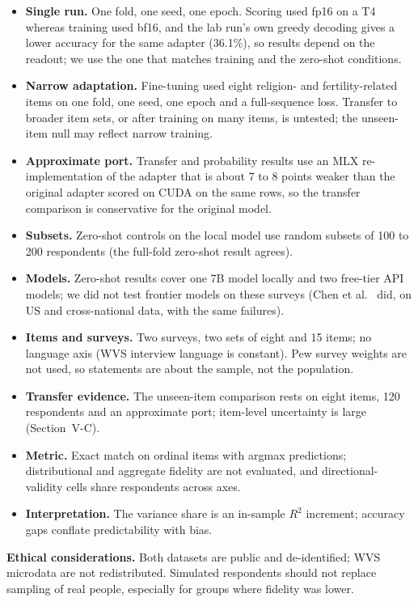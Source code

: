 \documentclass[conference]{IEEEtran}
\begin{document}
\begin{itemize}
    \item \textbf{Single run.} One fold, one seed, one epoch. Scoring used fp16 on a T4 whereas training used bf16, and the lab run's own greedy decoding gives a lower accuracy for the same adapter (36.1\%), so results depend on the readout; we use the one that matches training and the zero-shot conditions.
    \item \textbf{Narrow adaptation.} Fine-tuning used eight religion- and fertility-related items on one fold, one seed, one epoch and a full-sequence loss. Transfer to broader item sets, or after training on many items, is untested; the unseen-item null may reflect narrow training.
    \item \textbf{Approximate port.} Transfer and probability results use an MLX re-implementation of the adapter that is about 7 to 8 points weaker than the original adapter scored on CUDA on the same rows, so the transfer comparison is conservative for the original model.
    \item \textbf{Subsets.} Zero-shot controls on the local model use random subsets of 100 to 200 respondents (the full-fold zero-shot result agrees).
    \item \textbf{Models.} Zero-shot results cover one 7B model locally and two free-tier API models; we did not test frontier models on these surveys (Chen et al.~\cite{chen2026} did, on US and cross-national data, with the same failures).
    \item \textbf{Items and surveys.} Two surveys, two sets of eight and 15 items; no language axis (WVS interview language is constant). Pew survey weights are not used, so statements are about the sample, not the population.
    \item \textbf{Transfer evidence.} The unseen-item comparison rests on eight items, 120 respondents and an approximate port; item-level uncertainty is large (Section~V-C).
    \item \textbf{Metric.} Exact match on ordinal items with argmax predictions; distributional and aggregate fidelity are not evaluated, and directional-validity cells share respondents across axes.
    \item \textbf{Interpretation.} The variance share is an in-sample $R^2$ increment; accuracy gaps conflate predictability with bias.
\end{itemize}

\textbf{Ethical considerations.} Both datasets are public and de-identified; WVS microdata are not redistributed. Simulated respondents should not replace sampling of real people, especially for groups where fidelity was lower.
\end{document}

